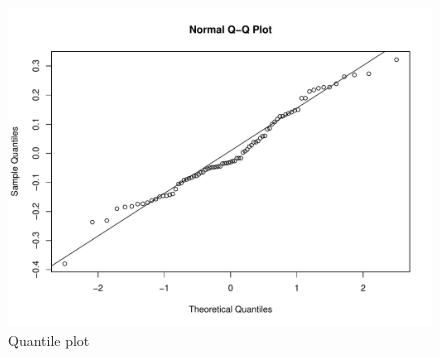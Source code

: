 \documentclass[12pt,a4paper]{article}
\begin{document}
\begin{appendices}
\begin{figure}[H]
	\includegraphics[width=\linewidth]{qqplot.pdf}
	\caption{Quantile plot}	 %
	\label{fig:qqplot}
\end{figure}







\end{appendices}


\printbibliography
\end{document}
